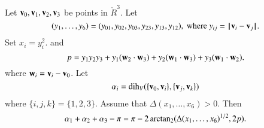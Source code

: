 \begin{lemma}\label{lemma:euler}
Let ${\mathbf v}_0,{\mathbf v}_1,{\mathbf v}_2,{\mathbf v}_3$ be points in $\ring{R}^3$. 
Let 
  $$(y_1,\ldots,y_6) =(y_{01},y_{02},y_{03},y_{23},y_{13},y_{12}),
   \text{ where } y_{ij}={\hskip0.1em|\hskip-0.15em|\hskip0.1em}{\mathbf v}_i - {\mathbf v}_j{\hskip0.1em|\hskip-0.15em|\hskip0.1em}.$$
Set
$x_i = y_i^2$.   
and
    $$
    p = y_1 y_2 y_3 + y_1 ({\mathbf w}_2\cdot {\mathbf w}_3) + y_2 ({\mathbf w}_1\cdot {\mathbf w}_3) + y_3
    ({\mathbf w}_1\cdot {\mathbf w}_2).
    $$
%
where ${\mathbf w}_i = {\mathbf v}_i- {\mathbf v}_0$.
Let $$\alpha_i =\operatorname{dih}_V(\{{\mathbf v}_0,{\mathbf v}_i\},\{{\mathbf v}_j,{\mathbf v}_k\})$$
where $\{i,j,k\}=\{1,2,3\}$.
Assume that $\Delta(x_1,\ldots,x_6)>0$. 
Then
    $$
    \alpha_1+\alpha_2+\alpha_3 - \pi
     = {\pi} - 2\,{\operatorname{arctan_2}}({\Delta(x_1,\ldots,x_6)^{1/2}},{2 p}).
    $$
\end{lemma}
%

